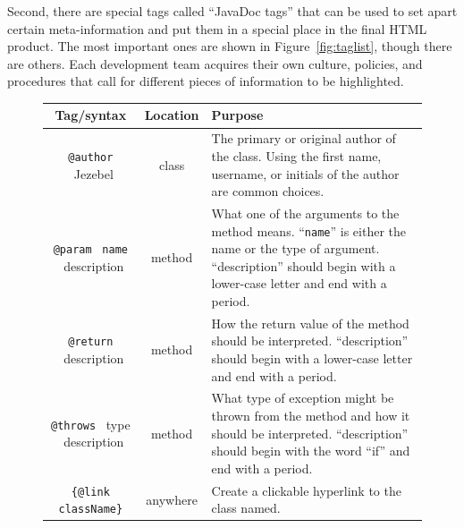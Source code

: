 Second, there are special tags called ``JavaDoc tags'' that can be used to set
apart certain meta-information and put them in a special place in the final
HTML product. The most important ones are shown in Figure~\ref{fig:taglist},
though there are others. Each development team acquires their own culture,
policies, and procedures that call for different pieces of information to be
highlighted.

\renewcommand\tabularxcolumn[1]{m{#1}}

\begin{figure}[ht]
\centering
\scriptsize
\begin{tabularx}{\textwidth}{|c|c|X|}
\hline
Tag/syntax & Location & Purpose\\

\hline
\hline

\index{author tag@\texttt{"@author} tag}
\texttt{@author} \ Jezebel & class & 
The primary or original author of the class. Using the first name, username, or
initials of the author are common choices.\\

\hline

\index{param tag@\texttt{"@param} tag}
\texttt{@param} \ \texttt{name} \ description & method & 
What one of the arguments to the method means.
``\texttt{name}'' is either the name or the type of argument.
``description'' should begin with a lower-case letter
and end with a period.\\

\hline

\index{return tag@\texttt{"@return} tag}
\texttt{@return} \ description & method & 
How the return value of the method should be
interpreted. ``description'' should begin with a
lower-case letter and end with a period.\\

\hline

\index{throws tag@\texttt{"@throws} tag}
\texttt{@throws} \ type \ description & method & 
What type of exception might be thrown from the
method and how it should be interpreted.
``description'' should begin with the word ``if'' and
end with a period.\\

\hline
\index{link tag@\texttt{"@link} tag}
\texttt{\{@link className\}} & anywhere &
Create a clickable hyperlink to the class named.\\


\end{tabularx}
\end{figure}
